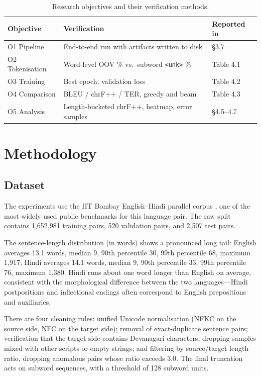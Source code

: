 \documentclass[a4paper,12pt]{vpcoe}
\begin{document}
\begin{table}[h]
\centering
\caption{Research objectives and their verification methods.}
\label{tab:objmap}
\begin{tabular}{@{}lll@{}}
\toprule
Objective & Verification & Reported in \\
\midrule
O1 Pipeline & End-to-end run with artifacts written to disk & \S 3.7 \\
O2 Tokenisation & Word-level OOV \% vs.\ subword \texttt{<unk>} \% & Table 4.1 \\
O3 Training & Best epoch, validation loss & Table 4.2 \\
O4 Comparison & BLEU / chrF++ / TER, greedy and beam & Table 4.3 \\
O5 Analysis & Length-bucketed chrF++, heatmap, error samples & \S 4.5--4.7 \\
\bottomrule
\end{tabular}
\end{table}

\chapter{Methodology}

\section{Dataset}
The experiments use the IIT Bombay English--Hindi parallel corpus \cite{kunchukuttan2018}, one of the most widely used public benchmarks for this language pair. The raw split contains 1,652,981 training pairs, 520 validation pairs, and 2,507 test pairs.

The sentence-length distribution (in words) shows a pronounced long tail: English averages 13.1 words, median 9, 90th percentile 30, 99th percentile 68, maximum 1,917; Hindi averages 14.1 words, median 9, 90th percentile 33, 99th percentile 76, maximum 1,380. Hindi runs about one word longer than English on average, consistent with the morphological difference between the two languages---Hindi postpositions and inflectional endings often correspond to English prepositions and auxiliaries.

There are four cleaning rules: unified Unicode normalisation (NFKC on the source side, NFC on the target side); removal of exact-duplicate sentence pairs; verification that the target side contains Devanagari characters, dropping samples mixed with other scripts or empty strings; and filtering by source/target length ratio, dropping anomalous pairs whose ratio exceeds 3.0. The final truncation acts on subword sequences, with a threshold of 128 subword units.
\end{document}

